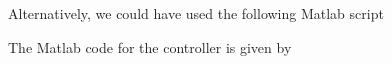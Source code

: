 Alternatively, we could have used the following Matlab script
%
%
\ifsolutionmanual

\else

\fi


The Matlab code for the controller is given by
%
%
\ifsolutionmanual

\else

\fi
